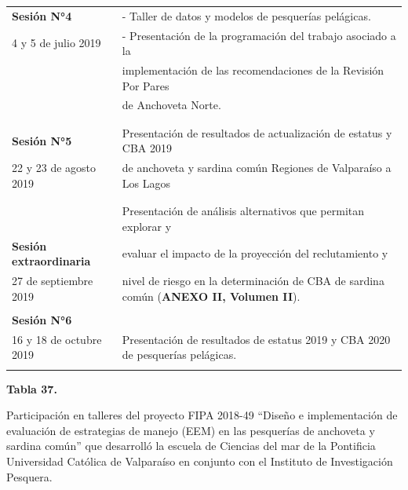\documentclass[
  spanish,
]{article}
\begin{document}
\begin{table}[h]
{\begin{tabular}{|l|l|}
    \textbf{Sesión N°4}   & -   Taller de datos y modelos de pesquerías pelágicas.\\
    4 y 5 de julio 2019   & -   Presentación de la programación del trabajo asociado a la \\
                          &   implementación de las recomendaciones de la Revisión Por Pares \\
                          &   de Anchoveta Norte. \\ 
                          & \\ \hline
                          & \\
   \textbf{Sesión N°5}      & Presentación de resultados de actualización de estatus y CBA 2019 \\
  22 y 23 de agosto 2019  & de anchoveta y sardina común Regiones de Valparaíso a Los Lagos \\ 
                          & \\ \hline
                          & \\
                          & Presentación de análisis alternativos que permitan explorar y \\
   \textbf{Sesión extraordinaria} & evaluar el impacto de la proyección del reclutamiento y \\
   27 de septiembre 2019  & nivel de riesgo en la determinación de CBA de sardina común (\textbf{ANEXO II, Volumen II}). \\
                          & \\ \hline
  \textbf{Sesión N°6}     & \\
  16 y 18 de octubre 2019   & Presentación de resultados de estatus 2019 y CBA 2020 de pesquerías pelágicas. \\ 
                          & \\ \hline
  \end{tabular}}
    \end{table}

\pagebreak

\small
\begin{center} 
\textbf{Tabla 37.}
\end{center}
\begin{center} 
\vspace{-0.2cm} Participación en talleres del proyecto FIPA 2018-49 “Diseño e implementación de evaluación de estrategias de manejo (EEM) en las pesquerías de anchoveta y sardina común” que desarrolló la escuela de Ciencias del mar de la Pontificia Universidad Católica de Valparaíso en conjunto con el Instituto de Investigación Pesquera.
\end{center}
\vspace{-0.2cm}
\end{document}
